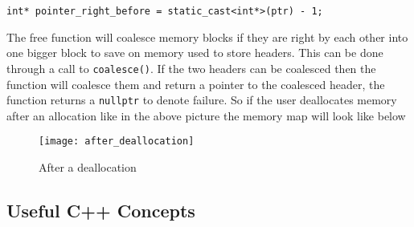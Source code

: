 \documentclass{article}
\begin{document}
\begin{lstlisting}
int* pointer_right_before = static_cast<int*>(ptr) - 1;
\end{lstlisting}

The free function will coalesce memory blocks if they are right by each other
into one bigger block to save on memory used to store headers.  This can be
done through a call to \texttt{coalesce()}.  If the two headers can be
coalesced then the function will coalesce them and return a pointer to the
coalesced header, the function returns a \texttt{nullptr} to denote failure.
So if the user deallocates memory after an allocation like in the above
picture the memory map will look like below

\begin{figure}[!htb]
\centering
\texttt{[image: after\_deallocation]}
\caption{After a deallocation}
\end{figure}

\newpage
\subsection{Useful C++ Concepts}
\end{document}
